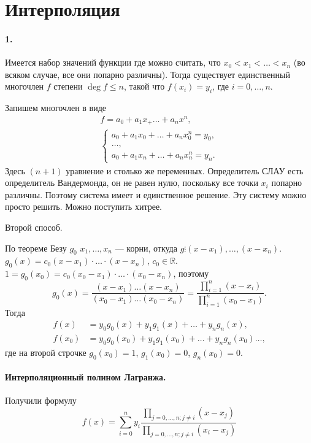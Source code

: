 \section{Интерполяция}
\paragraph{1.} Имеется набор значений функции
где можно считать, что $ x_0 < x_1 < \ldots < x_n $ (во всяком случае, все они
попарно различны). Тогда существует единственный многочлен $ f $ степени $ \deg
f\leqslant n $, такой что $ f(x_i) = y_i $, где $ i = 0, \ldots, n $.

Запишем многочлен в виде  
\begin{gather*}
  f= a_0 + a_1 x_ + \ldots + a_n x^n,\\
   \begin{cases}
    a_0 + a_1x_0 + \ldots + a_n x^n_0 = y_0,\\
    \ldots,\\
    a_0 + a_1x_n + \ldots + a_nx^n_n = y_n.
  \end{cases}
\end{gather*}
Здесь $ (n+1) $ уравнение и столько же переменных. Определитель СЛАУ есть
определитель Вандермонда, он не равен нулю, поскольку все точки $ x_i $ попарно
различны. Поэтому система имеет и единственное решение. Эту систему можно просто
решить. Можно поступить хитрее.

Второй способ. 

По теореме Безу $ g_0 $ $ x_1, \ldots, x_n $ --- корни, откуда $ g\vdots
(x-x_1), \ldots, (x-x_n) $. $ g_0(x) = c_0(x-x_1) \cdot \ldots \cdot (x-x_n) $,
$ c_0 \in \mathbb R $. $ 1 = g_0(x_0) = c_0(x_0 - x_1) \cdot\ldots\cdot(x_0 -
x_n) $, поэтому  
\[
    g_0(x) = \frac{(x-x_1)\ldots(x-x_n)}{(x_0-x_1)\ldots(x_0-x_n)}=
    \frac{\prod_{i=1}^n(x-x_i)}{\prod_{i=1}^n(x_0 - x_1)}.
\]
Тогда  
\begin{align*}
  f(x) &= y_0g_0(x) + y_1g_1(x) + \ldots + y_ng_n(x),\\
  f(x_0)&= y_0 g_0(x_0) + y_1g_1(x_0) + \ldots + y_ng_n(x_0)\ldots,
\end{align*}
где на второй строчке $ g_0(x_0) = 1 $, $ g_1(x_0) = 0 $, $ g_n(x_0) = 0 $.

\paragraph{Интерполяционный полином Лагранжа.} Получили формулу  
\[
  f(x) = \sum_{i=0}^n y_i \frac{\prod\limits_{j=0, \ldots, n; j\neq i}
  (x-x_j)}{\prod\limits_{j=0, \ldots, n; j\neq i} (x_i - x_j)}
\]

